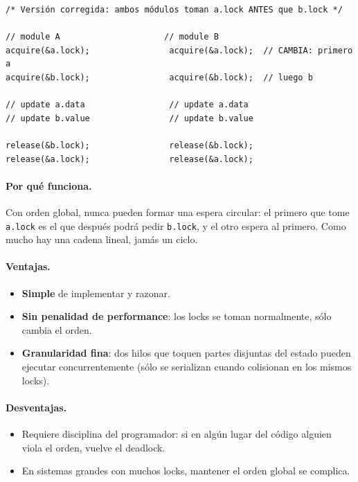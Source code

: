 \documentclass[11pt,a4paper]{article}
\begin{document}
\begin{lstlisting}[style=cstyle]
/* Versión corregida: ambos módulos toman a.lock ANTES que b.lock */

// module A                     // module B
acquire(&a.lock);                acquire(&a.lock);  // CAMBIA: primero a
acquire(&b.lock);                acquire(&b.lock);  // luego b

// update a.data                 // update a.data
// update b.value                // update b.value

release(&b.lock);                release(&b.lock);
release(&a.lock);                release(&a.lock);
\end{lstlisting}

\paragraph{Por qué funciona.} Con orden global, nunca pueden formar
una espera circular: el primero que tome \texttt{a.lock} es el que
después podrá pedir \texttt{b.lock}, y el otro espera al primero.
Como mucho hay una cadena lineal, jamás un ciclo.

\paragraph{Ventajas.}
\begin{itemize}[leftmargin=*,nosep]
    \item \textbf{Simple} de implementar y razonar.
    \item \textbf{Sin penalidad de performance}: los locks se toman
        normalmente, sólo cambia el orden.
    \item \textbf{Granularidad fina}: dos hilos que toquen partes
        disjuntas del estado pueden ejecutar concurrentemente
        (sólo se serializan cuando colisionan en los mismos locks).
\end{itemize}

\paragraph{Desventajas.}
\begin{itemize}[leftmargin=*,nosep]
    \item Requiere disciplina del programador: si en algún lugar
        del código alguien viola el orden, vuelve el deadlock.
    \item En sistemas grandes con muchos locks, mantener el orden
        global se complica.
\end{itemize}
\end{document}
